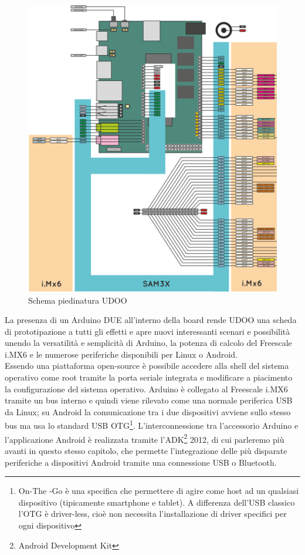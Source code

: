 \begin{figure}[!htb] \center
\includegraphics[width=\textwidth]{immagini/udoo_pinout.png}
\caption{Schema piedinatura UDOO} 
\end{figure}

La presenza di un Arduino DUE all'interno della board rende UDOO una scheda di 
prototipazione a tutti gli effetti e apre nuovi interessanti scenari e 
possibilità unendo la versatilità e semplicità di Arduino, la potenza di 
calcolo del Freescale i.MX6 e le numerose periferiche disponibili per Linux o 
Android.\\
Essendo una piattaforma open-source è possibile accedere alla shell del 
sistema operativo come root tramite la porta seriale integrata e modificare a 
piacimento la configurazione del sistema operativo. Arduino è collegato al 
Freescale i.MX6 tramite un bus interno e quindi viene rilevato come una 
normale periferica USB da Linux; su Android la comunicazione tra i due 
dispositivi avviene sullo stesso bus ma usa lo standard USB OTG\footnote{On-The
-Go è una specifica che permettere di agire come host ad un qualsiasi  
dispositivo (tipicamente smartphone e tablet). A differenza dell'USB classico 
l'OTG è driver-less, cioè non necessita l'installazione di driver specifici 
per ogni dispositivo}. L'interconnessione tra l'accessorio Arduino e 
l'applicazione Android è realizzata tramite l'ADK\footnote{Android Development 
Kit} 2012, di cui parleremo più avanti in questo stesso capitolo, che permette 
l'integrazione delle più disparate periferiche a dispositivi Android tramite 
una connessione USB o Bluetooth.
